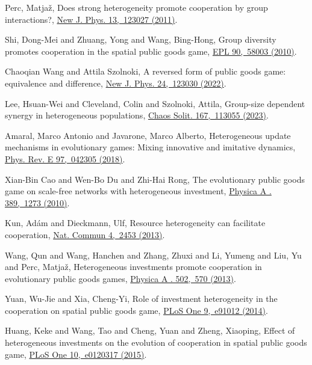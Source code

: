 \documentclass[twocolumn,aps,amsmath,pre,floatfix,superscriptaddress]{revtex4-2}
\begin{document}
\begin{thebibliography}{10}
Perc, Matja{\v{z}},
{Does strong heterogeneity promote cooperation by group interactions?},
\href {https://doi.org/10.1088/1367-2630/13/12/123027}
{New J. Phys. 13,~123027 (2011)}.

Shi, Dong-Mei and Zhuang, Yong and Wang, Bing-Hong,
{Group diversity promotes cooperation in the spatial public goods game},
\href {https://doi.org/10.1209/0295-5075/90/58003}
{EPL 90,~58003 (2010)}.

Chaoqian Wang and Attila Szolnoki,
{A reversed form of public goods game: equivalence and difference},
\href {https://doi.org/10.1088/1367-2630/acab25}
{New J. Phys. 24,~123030 (2022)}.


Lee, Hsuan-Wei and Cleveland, Colin and Szolnoki, Attila,
{Group-size dependent synergy in heterogeneous populations},
\href {https://doi.org/10.1016/j.chaos.2022.113055}
{Chaos Solit. 167,~113055 (2023)}.

Amaral, Marco Antonio and Javarone, Marco Alberto,
{Heterogeneous update mechanisms in evolutionary games: Mixing innovative and imitative dynamics},
\href {https://doi.org/10.1103/PhysRevE.97.042305}
{Phys. Rev. E 97,~042305  (2018)}.

Xian-Bin Cao and Wen-Bo Du and Zhi-Hai Rong,
{The evolutionary public goods game on scale-free networks with heterogeneous investment},
\href {https://doi.org/10.1016/j.physa.2009.11.044}
{Physica A . 389,~1273 (2010)}.

Kun, Ad{\'a}m and Dieckmann, Ulf,
{Resource heterogeneity can facilitate cooperation},
\href {https://doi.org/10.1038/ncomms3453}
{Nat. Commun 4,~2453  (2013)}.

Wang, Qun and Wang, Hanchen and Zhang, Zhuxi and Li, Yumeng and Liu, Yu and Perc, Matja{\v{z}},
{Heterogeneous investments promote cooperation in evolutionary public goods games},
\href {https://doi.org/10.1016/j.physa.2018.02.140}
{Physica A . 502,~570 (2013)}.

Yuan, Wu-Jie and Xia, Cheng-Yi,
{Role of investment heterogeneity in the cooperation on spatial public goods game},
\href {https://doi.org/10.1371/journal.pone.0091012}
{PLoS One 9,~e91012 (2014)}.

Huang, Keke and Wang, Tao and Cheng, Yuan and Zheng, Xiaoping,
{Effect of heterogeneous investments on the evolution of cooperation in spatial public goods game},
\href {https://doi.org/10.1371/journal.pone.0120317}
{PLoS One 10,~e0120317 (2015)}.


\end{thebibliography}
\end{document}
